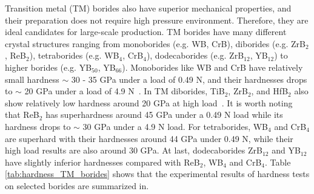 Transition metal (TM) borides also have superior mechanical properties, and their preparation does not require high pressure environment. Therefore, they are ideal candidates for large-scale production. TM borides have many different crystal structures ranging from monoborides (e.g. WB, CrB), diborides (e.g. ZrB$_2$, ReB$_2$), tetraborides (e.g. WB$_4$, CrB$_4$), dodecaborides (e.g. ZrB$_{12}$, YB$_{12}$) to higher borides (e.g. YB$_{50}$, YB$_{66}$). Monoborides like WB and CrB have relatively small hardness $\sim$ 30 - 35 GPa under a load of 0.49 N, and their hardnesses drops to $\sim$ 20 GPa under a load of 4.9 N~\cite{WB_yeung2016superhard, CrB_han2015hardness}. In TM diborides, TiB$_2$, ZrB$_2$, and HfB$_2$ also show relatively low hardness around 20 GPa at high load~\cite{TiB2_munro2000material,ZrB2_HfB2_zapata2013mechanical}. It is worth noting that ReB$_2$ has superhardness around 45 GPa under a 0.49 N load while its hardness drops to $\sim$ 30 GPa under a 4.9 N load. For tetraborides, WB$_4$ and CrB$_4$ are superhard with their hardnesses around 44 GPa under 0.49 N, while their high load results are also around 30 GPa. At last, dodecaborides ZrB$_{12}$ and YB$_{12}$ have slightly inferior hardnesses compared with ReB$_2$, WB$_4$ and CrB$_4$. Table \ref{tab:hardness_TM_borides} shows that the experimental results of hardness tests on selected borides are summarized in.

\vspace{24pt}



